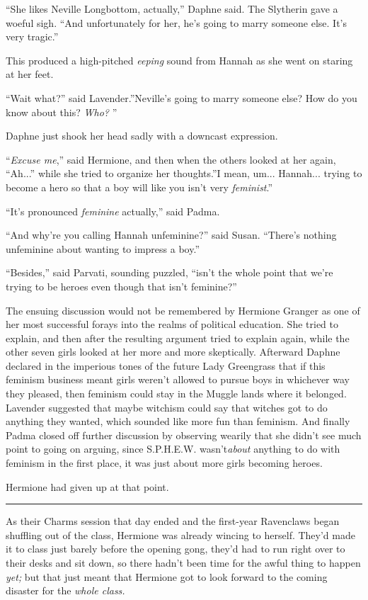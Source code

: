 ``She likes Neville Longbottom, actually,'' Daphne said. The Slytherin
gave a woeful sigh. ``And unfortunately for her, he's going to marry
someone else. It's very tragic.''

This produced a high-pitched \emph{eeping} sound from Hannah as she went
on staring at her feet.

``Wait what?'' said Lavender.''Neville's going to marry someone else?
How do you know about this? \emph{Who?} ''

Daphne just shook her head sadly with a downcast expression.

``\emph{Excuse me},'' said Hermione, and then when the others looked at
her again, ``Ah...'' while she tried to organize her thoughts.''I
mean, um... Hannah... trying to become a hero so that a boy
will like you isn't very \emph{feminist}.''

``It's pronounced \emph{feminine} actually,'' said Padma.

``And why're you calling Hannah unfeminine?'' said Susan. ``There's
nothing unfeminine about wanting to impress a boy.''

``Besides,'' said Parvati, sounding puzzled, ``isn't the whole point
that we're trying to be heroes even though that isn't feminine?''

The ensuing discussion would not be remembered by Hermione Granger as
one of her most successful forays into the realms of political
education. She tried to explain, and then after the resulting argument
tried to explain again, while the other seven girls looked at her more
and more skeptically. Afterward Daphne declared in the imperious tones
of the future Lady Greengrass that if this feminism business meant girls
weren't allowed to pursue boys in whichever way they pleased, then
feminism could stay in the Muggle lands where it belonged. Lavender
suggested that maybe witchism could say that witches got to do anything
they wanted, which sounded like more fun than feminism. And finally
Padma closed off further discussion by observing wearily that she didn't
see much point to going on arguing, since S.P.H.E.W. wasn't\emph{about}
anything to do with feminism in the first place, it was just about more
girls becoming heroes.

Hermione had given up at that point.

\begin{center}\rule{3in}{0.4pt}\end{center}

As their Charms session that day ended and the first-year Ravenclaws
began shuffling out of the class, Hermione was already wincing to
herself. They'd made it to class just barely before the opening gong,
they'd had to run right over to their desks and sit down, so there
hadn't been time for the awful thing to happen \emph{yet;} but that just
meant that Hermione got to look forward to the coming disaster for the
\emph{whole class.}

